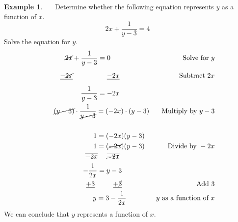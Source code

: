 \documentclass[11pt]{book}
\theoremstyle{definition}  %
\newtheorem{example}{Example}[chapter]
\begin{document}
\begin{example}~~~Determine whether the following equation represents $y$ as a function of $x$.
$$2x+\dfrac{1}{y-3}=4$$
 Solve the equation for $y$.
  \begin{eqnarray*}
    \cancel{2x}+\dfrac{1}{y-3}=0~~~~~~~~~~~~~~~~~  & & \text{Solve~for~} y\\
		\underline{-\cancel{2x}}\phantom{+\dfrac{1}{y-3}=}~~\underline{-2x}~~~~~~~~~~~~~ && \text{Subtract~} 2x\\
    ~~~\dfrac{1}{y-3}=-2x~~~~~~~~~~~~~  & & \\
    ~~~~~~\cancel{(y-3)}\cdot\dfrac{1}{\cancel{y-3}}=(-2x)\cdot(y-3)  & & \text{Multiply~by~} y-3\\
		&&\\
		1=(-2x)(y-3)~~ & & \\
		1=(\cancel{-2x})(y-3)~~ & & \text{Divide~by~}-2x\\
		\overline{-2x}~~~~\overline{\cancel{-2x}}~~~~~~~~~~~~~ &&\\
		-\dfrac{1}{2x}=y-3~~~~~~~~~~~~&&\\
		\underline{+3}~~~~~~~~\underline{+\cancel{3}}~~~~~~~~~~~~ & &\text{Add~}3\\
		y=3-\dfrac{1}{2x}~~~~~~~~~~ & & y \text{~as~a~function~of~} x
	\end{eqnarray*}
We can conclude that $y$ represents a function of $x$.
 \end{example}
\end{document}
